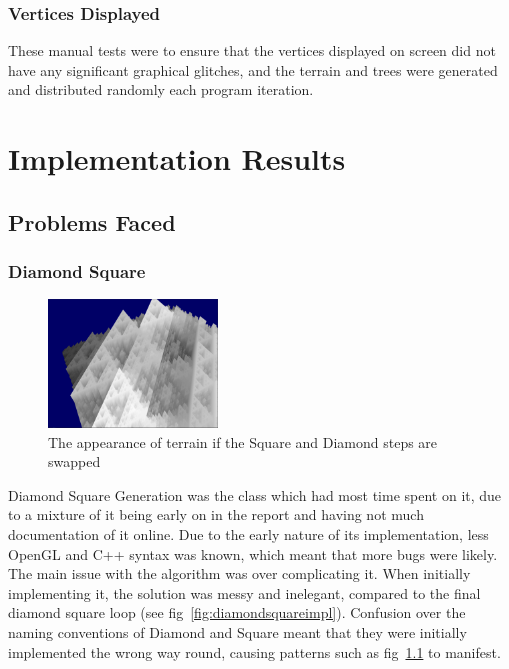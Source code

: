 \documentclass[a4paper,10pt]{report}
\begin{document}
\subsection{Vertices Displayed}

These manual tests were to ensure that the vertices displayed on screen did not have any significant graphical glitches, and the terrain and trees were generated and distributed randomly each program iteration.

\chapter{Implementation Results}
\section{Problems Faced}
\subsection{Diamond Square}

\begin{figure}[h!]
    \centering
  \includegraphics[width=0.4\textwidth]{Images/Screenshots/Glitch.png}
 \caption{The appearance of terrain if the Square and Diamond steps are swapped}
 \label{fig:glitch}
\end{figure}

Diamond Square Generation was the class which had most time spent on it, due to a mixture of it being early on in the report and having not much documentation of it online. Due to the early nature of its implementation, less OpenGL and C++ syntax was known, which meant that more bugs were likely. The main issue with the algorithm was over complicating it. When initially implementing it, the solution was messy and inelegant, compared to the final diamond square loop (see fig~\ref{fig:diamondsquareimpl}). Confusion over the naming conventions of Diamond and Square meant that they were initially implemented the wrong way round, causing patterns such as fig~\ref{fig:glitch} to manifest. \medskip
\clearpage
\end{document}
